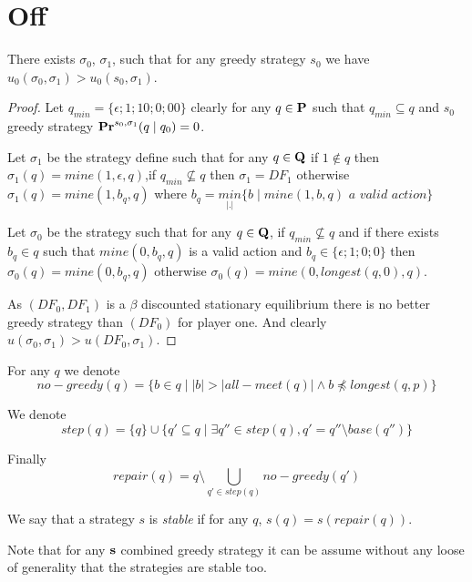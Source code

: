 
\newcommand{\ameet}{\text{\rm all-meet}}
\newcommand{\base}{\text{\rm base}}

\section{Off}

\begin{myprop}
	There exists $\sigma_0$, $\sigma_1$, such that for any greedy strategy $s_0$ we have $u_0(\sigma_0,\sigma_1) > u_0(s_0,\sigma_1)$.
\end{myprop}
\begin{proof}
	Let $q_{min} = \{\epsilon; 1;10;0;00\}$ clearly for any $q \in \mathbf{P}$ such that $q_{min} \subseteq q$ and $s_0$ greedy strategy $\mathbf{Pr}^{s_0,\sigma_1}(q \mid q_0) = 0$.
	
	Let $\sigma_1$ be the strategy define such that for any $q \in \mathbf{Q}$ if $1 \notin q$ then $\sigma_1(q) = mine(1,\epsilon,q)  $,if $q_{min} \not \subseteq q$ then $\sigma_1 = DF_1$ otherwise $\sigma_1(q) = mine(1,b_{q},q)$ where $b_{q} = \underset{|.|}{min}\{ b \mid mine(1,b,q) \textit{ a valid action}\}$
	
	Let $\sigma_0$ be the strategy such that for any $q \in \mathbf{Q}$, if $q_{min} \not \subseteq q$ and if there exists $b_q \in q$ such that $mine(0,b_q,q)$ is a valid action and $b_q \in \{\epsilon; 1;0;0\}$ then $\sigma_0(q) = mine(0,b_q,q)$ otherwise  $\sigma_0(q) = mine(0,longest(q,0),q)$.
	
	As $(DF_0,DF_1)$ is a $\beta$ discounted stationary equilibrium there is no better greedy strategy than $(DF_0)$ for player one. And clearly $u(\sigma_0,\sigma_1) > u(DF_0,\sigma_1)$.
\end{proof}

For any $q$ we denote $$no-greedy(q) = \{ b \in q \mid |b| > |all-meet(q)| \land  b \not \preceq longest(q,p) \}$$

We denote $$step(q) = \{q\} \cup \{ q' \subseteq q \mid \exists q'' \in step(q), q' = q'' \setminus base(q'') \}$$

Finally $$repair(q) = q \setminus \bigcup_{q' \in step(q)} no-greedy(q')$$
\begin{mydef}\label{def-stable}
	We say that a strategy $s$ is \textit{stable} if for any $q$, $s(q) = s(repair(q))$.
\end{mydef}
Note that for any $\mathbf{s}$ combined greedy strategy it can be assume without any loose of generality that the strategies are stable too.




